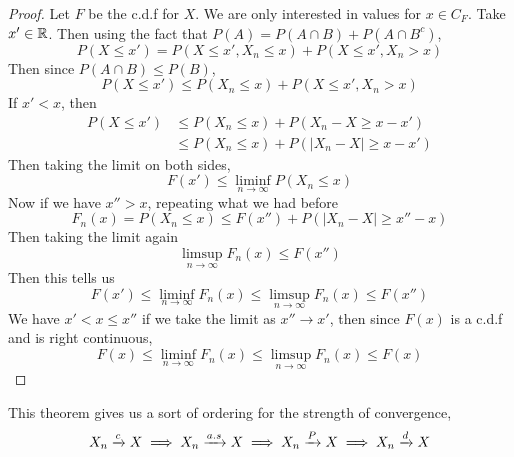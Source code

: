 \documentclass[openany]{report}
\begin{document}
\begin{proof}
    Let $F$ be the c.d.f for $X$.  We are only interested in values for $x \in C_F$. Take $x' \in \mathbb{R}$. Then using the fact that $P(A) = P(A \cap B) + P(A \cap B^c)$,
    \[P(X \leq x') = P(X\leq x', X_n \leq x) + P(X \leq x', X_n > x)\]
    Then since $P(A \cap B) \leq P(B)$,
    \[P(X \leq x') \leq P(X_n \leq x) + P(X \leq x', X_n > x)\]
    If $x' < x$, then 
    \begin{align*}
        P(X \leq x') &\leq P(X_n \leq x) + P(X_n - X \geq x - x')\\
        &\leq P(X_n \leq x) + P(|X_n - X| \geq x - x') 
    \end{align*}
    Then taking the limit on both sides, 
    \[F(x') \leq \liminf_{n\rightarrow\infty} P(X_n \leq x)\]
    Now if we have $x'' > x$, repeating what we had before
    \[F_n(x) = P(X_n \leq x) \leq F(x'') + P(|X_n - X| \geq x'' -x)\]
    Then taking the limit again 
    \[\limsup_{n\rightarrow\infty} F_n(x) \leq F(x'')\]
    Then this tells us 
    \[F(x') \leq \liminf_{n\rightarrow\infty}F_n(x) \leq \limsup_{n\rightarrow\infty} F_n(x) \leq F(x'')\]
    We have $x' < x \leq x''$ if we take the limit as $x'' \rightarrow x'$, then since $F(x)$ is a c.d.f and is right continuous, 
    \[F(x) \leq \liminf_{n\rightarrow\infty} F_n(x) \leq \limsup_{n\rightarrow\infty} F_n(x) \leq F(x)\]
\end{proof}
This theorem gives us a sort of ordering for the strength of convergence, 
\[X_n \xrightarrow{c} X \implies X_n \xrightarrow{a.s} X \implies X_n \xrightarrow{P} X \implies X_n \xrightarrow{d} X\]
\end{document}
